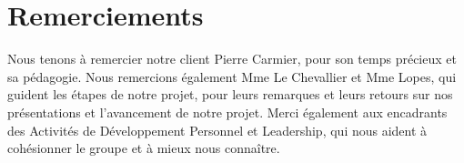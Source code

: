 \section*{Remerciements}

Nous tenons à remercier notre client Pierre Carmier, pour son temps précieux et sa pédagogie. 
Nous remercions également Mme Le Chevallier et Mme Lopes, qui guident les étapes de notre projet, pour leurs remarques et leurs retours sur nos présentations et l'avancement de notre projet.
Merci également aux encadrants des Activités de Développement Personnel et Leadership, qui nous aident à cohésionner le groupe et à mieux nous connaître.